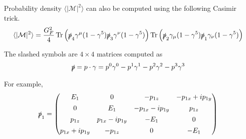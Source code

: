 \documentclass[12pt]{article}
\begin{document}
\noindent
Probability density $\langle|\mathcal{M}|^2\rangle$ can also be computed
using the following Casimir trick.
\begin{equation*}
\langle|\mathcal{M}|^2\rangle
=\frac{G_F^2}{4}
\mathop{\text{Tr}}
\left(\slashed{p}_4\gamma^\mu(1-\gamma^5)\slashed{p}_3\gamma^\nu(1-\gamma^5)\right)
\mathop{\text{Tr}}
\left(\slashed{p}_2\gamma_\mu(1-\gamma^5)\slashed{p}_1\gamma_\nu(1-\gamma^5)\right)
\end{equation*}

\noindent
The slashed symbols are $4\times4$ matrices computed as
\begin{equation*}
\slashed{p}=p\cdot\gamma
=p^0\gamma^0-p^1\gamma^1-p^2\gamma^2-p^3\gamma^3
\end{equation*}

\noindent
For example,
\begin{equation*}
\slashed{p}_1=\begin{pmatrix}
E_1 & 0 & -p_{1z} & -p_{1x} + ip_{1y}
\\[1ex]
0 & E_1 & -p_{1x} - ip_{1y} & p_{1z}
\\[1ex]
p_{1z} & p_{1x} - i p_{1y} & -E_1 & 0
\\[1ex]
p_{1x} + ip_{1y} & -p_{1z} & 0 & -E_1
\end{pmatrix}
\end{equation*}
\end{document}

